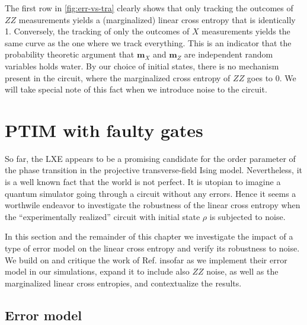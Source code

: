 The first row in \cref{fig:err-vs-tra} clearly shows that only tracking the outcomes
of $ZZ$ measurements yields a (marginalized) linear cross entropy that is
identically 1. Conversely, the tracking of only the outcomes of $X$
measurements yields the same curve as the one where we track everything. This
is an indicator that the probability theoretic argument that $\mathbf{m}_X$ and
$\mathbf{m}_Z$ are independent random variables holds water. By our choice of
initial states, there is no mechanism present in the circuit, where the
marginalized cross entropy of $ZZ$ goes to 0. We will take special note of this
fact when we introduce noise to the circuit.

\section{PTIM with faulty gates}
So far, the LXE appears to be a promising candidate for the order parameter of
the phase transition in the projective transverse-field Ising model.
Nevertheless, it is a well known fact that the world is not perfect. It is
utopian to imagine a quantum simulator going through a circuit without any
errors. Hence it seems a worthwile endeavor to investigate the robustness of the
linear cross entropy when the \enquote{experimentally realized} circuit with initial state $\rho$ is
subjected to noise.

In this section and the remainder of this chapter we investigate the
impact of a type of error model on the linear cross entropy and verify its
robustness to noise. We build on and critique the work of Ref.
\cite{tikhanovskayaUniversalityCrossEntropy2023} insofar as we
implement their error model in our simulations, expand it to include also $ZZ$
noise, as well as the marginalized linear cross entropies, and contextualize
the results.
\clearpage
\subsection{Error model}\label{sec:errormodel}

